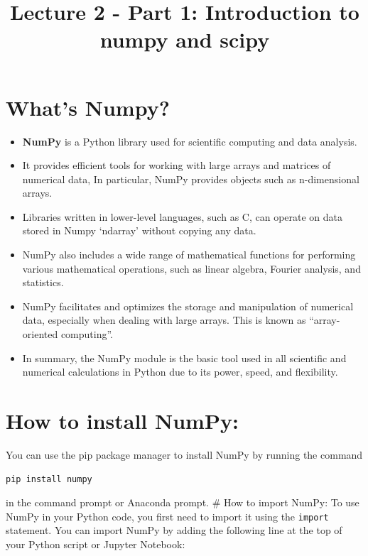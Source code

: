\documentclass[11pt]{article}
\title{Lecture 2 - Part 1: Introduction to numpy and scipy}
\date{}
\providecommand{\tightlist}{%
      \setlength{\itemsep}{0pt}\setlength{\parskip}{0pt}}
\begin{document}
    
    \maketitle
    
    

    
    \hypertarget{whats-numpy}{%
\section{What's Numpy?}\label{whats-numpy}}

\begin{itemize}
\tightlist
\item
  \textbf{NumPy} is a Python library used for scientific computing and
  data analysis.
\item
  It provides efficient tools for working with large arrays and matrices
  of numerical data, In particular, NumPy provides objects such as
  n-dimensional arrays.
\item
  Libraries written in lower-level languages, such as C, can operate on
  data stored in Numpy `ndarray' without copying any data.
\item
  NumPy also includes a wide range of mathematical functions for
  performing various mathematical operations, such as linear algebra,
  Fourier analysis, and statistics.
\item
  NumPy facilitates and optimizes the storage and manipulation of
  numerical data, especially when dealing with large arrays. This is
  known as ``array-oriented computing''.
\item
  In summary, the NumPy module is the basic tool used in all scientific
  and numerical calculations in Python due to its power, speed, and
  flexibility.
\end{itemize}

\hypertarget{how-to-install-numpy}{%
\section{How to install NumPy:}\label{how-to-install-numpy}}

You can use the pip package manager to install NumPy by running the
command

\begin{verbatim}
pip install numpy
\end{verbatim}

in the command prompt or Anaconda prompt. \# How to import NumPy: To use
NumPy in your Python code, you first need to import it using the
\texttt{import} statement. You can import NumPy by adding the following
line at the top of your Python script or Jupyter Notebook:
\end{document}
